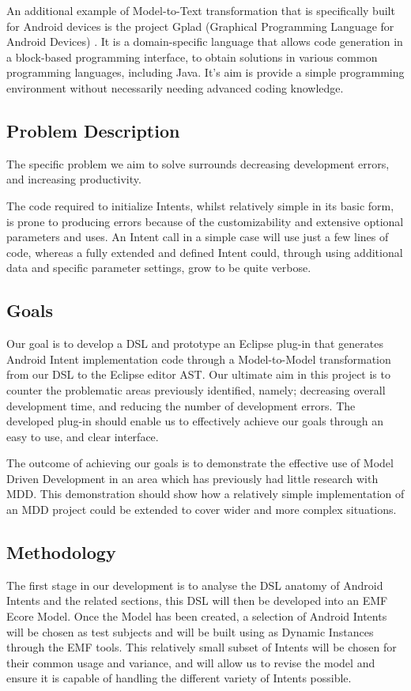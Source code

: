 An additional example of Model-to-Text transformation that is specifically built for Android devices is the project Gplad (Graphical Programming Language for Android Devices) \cite{gplad}. It is a domain-specific language that allows code generation in a block-based programming interface, to obtain solutions in various common programming languages, including Java. It's aim is provide a simple programming environment without necessarily needing advanced coding knowledge.

\subsection{Problem Description} 
The specific problem we aim to solve surrounds decreasing development errors, and increasing productivity.

The code required to initialize Intents, whilst relatively simple in its basic form, is prone to producing errors because of the customizability and extensive optional parameters and uses. An Intent call in a simple case will use just a few lines of code, whereas a fully extended and defined Intent could, through using additional data and specific parameter settings, grow to be quite verbose.

\subsection{Goals}
Our goal is to develop a DSL and prototype an Eclipse plug-in that generates Android Intent implementation code through a Model-to-Model transformation from our DSL to the Eclipse editor AST. Our ultimate aim in this project is to counter the problematic areas previously identified, namely; decreasing overall development time, and reducing the number of development errors. The developed plug-in should enable us to effectively achieve our goals through an easy to use, and clear interface.

The outcome of achieving our goals is to demonstrate the effective use of Model Driven Development in an area which has previously had little research with MDD. This demonstration should show how a relatively simple implementation of an MDD project could be extended to cover wider and more complex situations.

\subsection{Methodology}
The first stage in our development is to analyse the DSL anatomy of Android Intents and the related sections, this DSL will then be developed into an EMF Ecore Model. Once the Model has been created, a selection of Android Intents will be chosen as test subjects and will be built using as Dynamic Instances through the EMF tools. This relatively small subset of Intents will be chosen for their common usage and variance, and will allow us to revise the model and ensure it is capable of handling the different variety of Intents possible.

